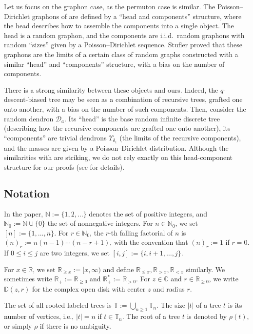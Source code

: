 \documentclass{article}
\theoremstyle{remark}
\newcommand{\bN}{\mathbb{N}}
\newcommand{\bR}{\mathbb{R}}
\newcommand{\bC}{\mathbb{C}}
\newcommand{\bT}{\mathbb{T}}
\newcommand{\abs}[1]{{\left|#1\right|}}
\newcommand{\bD}{\mathbb{D}}
\newcommand{\cD}{\mathcal{D}}
\begin{document}
Let us focus on the graphon case, as the permuton case is similar.
The Poisson--Dirichlet graphons of \cite{stufler2026poissondirichletgraphonspermutons} are defined by a \enquote{head and components} structure, where the head describes how to assemble the components into a single object.
The head is a random graphon, and the components are i.i.d.~random graphons with random \enquote{sizes} given by a Poisson--Dirichlet sequence.
Stufler proved that these graphons are the limits of a certain class of random graphs constructed with a similar \enquote{head} and \enquote{components} structure, with a bias on the number of components.

There is a strong similarity between these objects and ours.
Indeed, the $q$-descent-biased tree may be seen as a combination of recursive trees, grafted one onto another, with a bias on the number of such components.
Then, consider the random dendron $\cD_a$.
Its \enquote{head} is the base random infinite discrete tree (describing how the recursive components are grafted one onto another), its \enquote{components} are trivial dendrons $\Upsilon_{\delta_1}$ (the limits of the recursive components), and the masses are given by a Poisson--Dirichlet distribution.
Although the similarities with \cite{stufler2026poissondirichletgraphonspermutons} are striking, we do not rely exactly on this head-component structure for our proofs (see  for details).


\subsection{Notation}

In the paper, $\bN := \{1,2,\ldots\}$ denotes the set of positive integers, and $\bN_0 := \bN \cup \{0\}$ the set of nonnegative integers.
For $n\in\bN_0$, we set $[n] := \{1,\dots,n\}$.
For $r\in\bN_0$, the $r$-th falling factorial of $n$ is $(n)_r := n(n-1)\cdots(n-r+1)$, with the convention that $(n)_r := 1$ if $r=0$.
If $0\le i\le j$ are two integers, we set $[i,j] := \{i,i+1,\dots,j\}$.

For $x \in \bR$, we set $\bR_{\ge x}:=[x,\infty)$ and define $\bR_{\le x}, \bR_{> x}, \bR_{< x}$ similarly.
We sometimes write $\bR_+ := \bR_{\ge 0}$ and $\bR_+^* := \bR_{> 0}$.
For $z\in\bC$ and $r\in\bR_{\ge0}$, we write $\bD(z,r)$ for the complex open disk with center $z$ and radius $r$.

The set of all rooted labeled trees is $\bT := \bigcup_{n\ge1} \bT_n$.
The size $\abs{t}$ of a tree $t$ is its number of vertices, i.e., $\abs{t}=n$ if $t\in\bT_n$.
The root of a tree $t$ is denoted by $\rho(t)$, or simply $\rho$ if there is no ambiguity.
\end{document}
